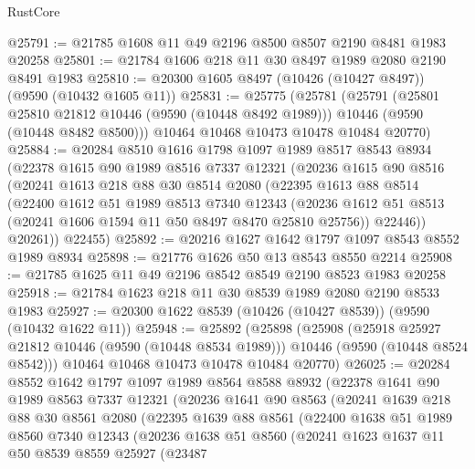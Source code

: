 \begin{lexlean}{RustCore}
\begin{coremodule}
@25791 := @21785 @1608 @11 @49 @2196 @8500 @8507 @2190 @8481 @1983 @20258
@25801 := @21784 @1606 @218 @11 @30 @8497 @1989 @2080 @2190 @8491 @1983
@25810 := @20300 @1605 @8497 (@10426 (@10427 @8497)) (@9590 (@10432 @1605 @11))
@25831 := @25775
    (@25781
      (@25791
        (@25801 @25810 @21812 @10446 (@9590 (@10448 @8492 @1989)))
        @10446
        (@9590 (@10448 @8482 @8500)))
      @10464
      @10468
      @10473
      @10478
      @10484
      @20770)
@25884 := @20284
    @8510
    @1616
    @1798
    @1097
    @1989
    @8517
    @8543
    @8934
    (@22378
      @1615
      @90
      @1989
      @8516
      @7337
      @12321
      (@20236
        @1615
        @90
        @8516
        (@20241
          @1613
          @218
          @88
          @30
          @8514
          @2080
          (@22395
            @1613
            @88
            @8514
            (@22400
              @1612
              @51
              @1989
              @8513
              @7340
              @12343
              (@20236 @1612 @51 @8513 (@20241 @1606 @1594 @11 @50 @8497 @8470 @25810 @25756))
              @22446))
          @20261))
      @22455)
@25892 := @20216 @1627 @1642 @1797 @1097 @8543 @8552 @1989 @8934
@25898 := @21776 @1626 @50 @13 @8543 @8550 @2214
@25908 := @21785 @1625 @11 @49 @2196 @8542 @8549 @2190 @8523 @1983 @20258
@25918 := @21784 @1623 @218 @11 @30 @8539 @1989 @2080 @2190 @8533 @1983
@25927 := @20300 @1622 @8539 (@10426 (@10427 @8539)) (@9590 (@10432 @1622 @11))
@25948 := @25892
    (@25898
      (@25908
        (@25918 @25927 @21812 @10446 (@9590 (@10448 @8534 @1989)))
        @10446
        (@9590 (@10448 @8524 @8542)))
      @10464
      @10468
      @10473
      @10478
      @10484
      @20770)
@26025 := @20284
    @8552
    @1642
    @1797
    @1097
    @1989
    @8564
    @8588
    @8932
    (@22378
      @1641
      @90
      @1989
      @8563
      @7337
      @12321
      (@20236
        @1641
        @90
        @8563
        (@20241
          @1639
          @218
          @88
          @30
          @8561
          @2080
          (@22395
            @1639
            @88
            @8561
            (@22400
              @1638
              @51
              @1989
              @8560
              @7340
              @12343
              (@20236
                @1638
                @51
                @8560
                (@20241
                  @1623
                  @1637
                  @11
                  @50
                  @8539
                  @8559
                  @25927
                  (@23487

\end{coremodule}
\end{lexlean}
